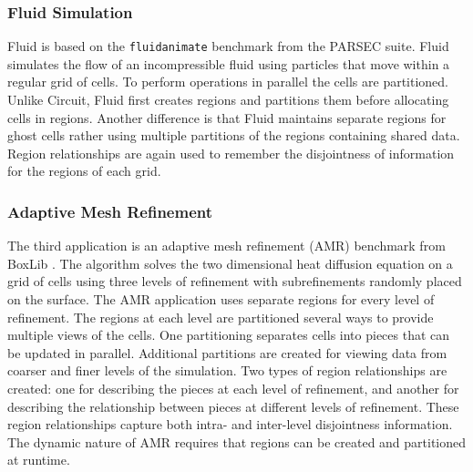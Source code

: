 \subsubsection{Fluid Simulation}
\label{subsec:fluid}
Fluid is based on the {\tt fluidanimate} benchmark from the PARSEC 
suite\cite{bienia11benchmarking}.  Fluid simulates the flow of an incompressible fluid
using particles that move within a regular grid of cells.  To perform operations in 
parallel the cells are partitioned.  Unlike
Circuit, Fluid first creates regions and partitions them before
allocating cells in regions.  Another difference is that Fluid
maintains separate regions for ghost cells rather using multiple partitions of
the regions containing shared data.  Region relationships are again used to remember
the disjointness of information for the regions of each grid.

\subsubsection{Adaptive Mesh Refinement}
\label{subsec:amr}
The third application is an adaptive mesh refinement (AMR) benchmark 
from BoxLib \cite{BoxLib}.  The algorithm solves the two
dimensional heat diffusion equation on a grid of cells using three levels of refinement with subrefinements
randomly placed on the surface.  
The AMR application uses separate regions for every level of
refinement.  The regions at each level are partitioned several ways to provide multiple views of
the cells.  One partitioning separates cells into pieces that can be updated in
parallel.  Additional partitions are created for viewing data from coarser and finer levels of
the simulation.  Two types of region relationships are created: one for describing the pieces at 
each level of refinement, and another for describing the relationship between pieces at different
levels of refinement.  These region relationships capture both intra- and inter-level disjointness
information.  The dynamic nature of AMR requires that regions can be created and partitioned
at runtime.  

